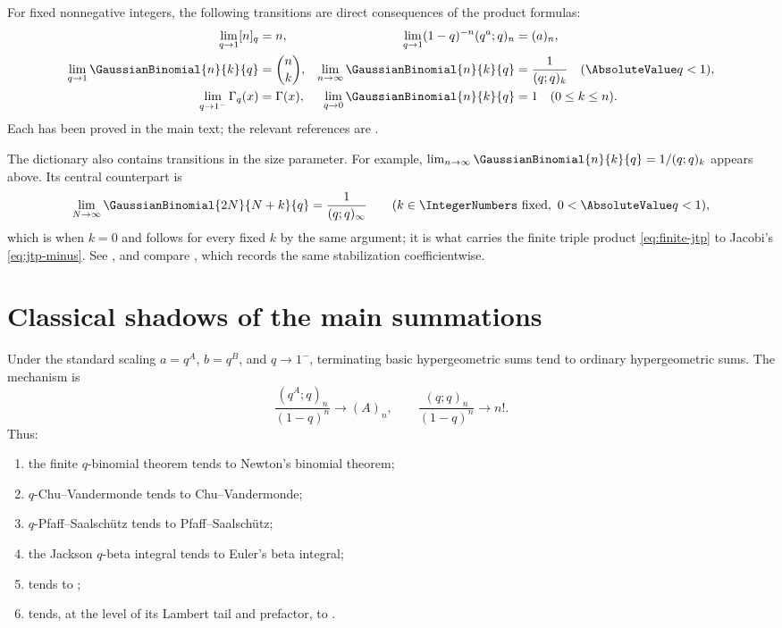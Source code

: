 \documentclass[11pt,a4paper,oneside,openany]{book}
\theoremstyle{definition}
\theoremstyle{remark}
\begin{document}
For fixed nonnegative integers, the following transitions are direct consequences of the product formulas:
\begin{align*}
 \lim_{q\to1}[n]_q&=n,
 &\lim_{q\to1}(1-q)^{-n}(q^a;q)_n&=(a)_n,\\
 \lim_{q\to1}\GaussianBinomial{n}{k}{q}&=\binom nk,
 &\lim_{n\to\infty}\GaussianBinomial{n}{k}{q}&=\frac1{(q;q)_k}\quad(\AbsoluteValue q<1),\\
 \lim_{q\to1^-}\Gamma_q(x)&=\Gamma(x),
 &\lim_{q\to0}\GaussianBinomial{n}{k}{q}&=1\quad(0\le k\le n).
\end{align*}
Each has been proved in the main text; the relevant references are .

\medskip
The dictionary also contains transitions in the size parameter.  For example,
$\lim_{n\to\infty}\GaussianBinomial{n}{k}{q}=1/(q;q)_k$ appears above.  Its central counterpart is
\[
 \lim_{N\to\infty}\GaussianBinomial{2N}{N+k}{q}=\frac1{(q;q)_\infty}
 \qquad(k\in\IntegerNumbers\text{ fixed},\ 0<\AbsoluteValue q<1),
\]
which is  when $k=0$ and follows for every fixed $k$
by the same argument; it is what carries the finite triple product
\eqref{eq:finite-jtp} to Jacobi's \eqref{eq:jtp-minus}.  See
, and compare
, which records the same stabilization
coefficientwise.

\section{Classical shadows of the main summations}

Under the standard scaling $a=q^A$, $b=q^B$, and $q\to1^-$, terminating basic hypergeometric sums tend to ordinary hypergeometric sums.  The mechanism is
\[
 \frac{(q^A;q)_n}{(1-q)^n}\longrightarrow(A)_n,
 \qquad
 \frac{(q;q)_n}{(1-q)^n}\longrightarrow n!.
\]
Thus:
\begin{enumerate}
\item the finite $q$-binomial theorem tends to Newton's binomial theorem;
\item $q$-Chu--Vandermonde tends to Chu--Vandermonde;
\item $q$-Pfaff--Saalsch\"utz tends to Pfaff--Saalsch\"utz;
\item the Jackson $q$-beta integral tends to Euler's beta integral;
\item {} tends to ;
\item {} tends, at the level of its Lambert tail and prefactor, to .
\end{enumerate}
\end{document}
